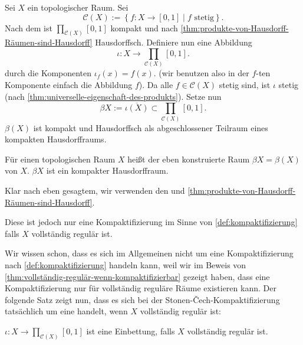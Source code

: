 Sei $X$ ein topologischer Raum. Sei 
\[
    \mathcal{C}(X) := \left \{f: X \to  [0,1] \mid  f \text{ stetig}\right\} 
.\] 
Nach dem  ist $\prod_{\mathcal{C}(X)}[0,1] $ kompakt und nach \autoref{thm:produkte-von-Hausdorff-Räumen-sind-Hausdorff} Hausdorffsch. Definiere nun eine Abbildung
\[
    ι : X \to  \prod_{\mathcal{C}(X)} [0,1]
.\] 
durch die Komponenten $ι_f(x) = f(x)$. (wir benutzen also in der  $f$-ten Komponente einfach die Abbildung  $f$). Da alle  $f\in \mathcal{C}(X)$ stetig sind, ist $ι$ stetig (nach \autoref{thm:universelle-eigenschaft-des-produkts}). Setze nun
\[
    βX := \overline{ι(X)} \subset \prod_{\mathcal{C}(X)} [0,1]
.\] 
$β(X)$ ist kompakt und Hausdorffsch als abgeschlossener Teilraum eines kompakten Hausdorffraums. \\
\begin{dtheoremdef}
    Für einen topologischen Raum $X$ heißt der eben konstruierte Raum $βX = β(X)$  von $X$. $\beta X$ ist ein kompakter Hausdorffraum.
\end{dtheoremdef}
\begin{proof*}
    Klar nach eben gesagtem, wir verwenden den  und \autoref{thm:produkte-von-Hausdorff-Räumen-sind-Hausdorff}.
\end{proof*}
\begin{warning}
Diese ist jedoch nur eine Kompaktifizierung im Sinne von \autoref{def:kompaktifizierung} falls $X$ vollständig regulär ist.
\end{warning}
\begin{remark*}
    Wir wissen schon, dass es sich im Allgemeinen nicht um eine Kompaktifizierung nach \autoref{def:kompaktifizierung} handeln kann, weil wir im Beweis von \autoref{thm:vollständig-regulär-wenn-kompaktifizierbar} gezeigt haben, dass eine Kompaktifizierung nur für vollständig reguläre Räume existieren kann. Der folgende Satz zeigt nun, dass es sich bei der Stonen-Čech-Kompaktifizierung tatsächlich um eine handelt, wenn $X$ vollständig regulär ist:
\end{remark*}
\begin{theorem}\label{thm:stone-cech-kompaktifizierung-ist-einbettung-für-vollständig-reguläre-räume}
     $ι: X \to  \prod_{\mathcal{C}(X)}[0,1]$ ist eine Einbettung, falls $X$ vollständig regulär ist.
\end{theorem}
